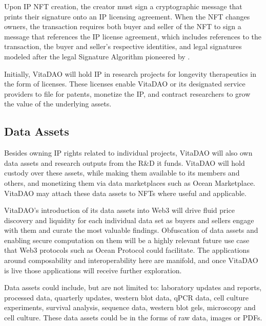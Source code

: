 \documentclass[12pt,letterpaper]{article}
\begin{document}
Upon IP NFT creation, the creator must sign a cryptographic message that prints their signature onto an IP licensing agreement. When the NFT changes owners, the transaction requires both buyer and seller of the NFT to sign a message that references the IP license agreement, which includes references to the transaction, the buyer and seller’s respective identities, and legal signatures modeled after the legal Signature Algorithm pioneered by \citet{OpenLaw2019}.


Initially, VitaDAO will hold IP in research projects for longevity therapeutics in the form of licenses. These licenses enable VitaDAO or its designated service providers to file for patents, monetize the IP, and contract researchers to grow the value of the underlying assets.

\subsection{Data Assets}
Besides owning IP rights related to individual projects, VitaDAO will also own data assets and research outputs from the R\&D it funds. VitaDAO will hold custody over these assets, while making them available to its members and others, and monetizing them via data marketplaces such as Ocean Marketplace. VitaDAO may attach these data assets to NFTs where useful and applicable. 

VitaDAO’s introduction of its data assets into Web3 will drive fluid price discovery and liquidity for each individual data set as buyers and sellers engage with them and curate the most valuable findings. Obfuscation of data assets and enabling secure computation on them will be a highly relevant future use case that Web3 protocols such as Ocean Protocol could facilitate. The applications around composability and interoperability here are manifold, and once VitaDAO is live those applications will receive further exploration.

Data assets could include, but are not limited to: laboratory updates and reports, processed data, quarterly updates, western blot data, qPCR data, cell culture experiments, survival analysis, sequence data, western blot gels, microscopy and cell culture. These data assets could be in the forms of raw data, images or PDFs.
\end{document}
